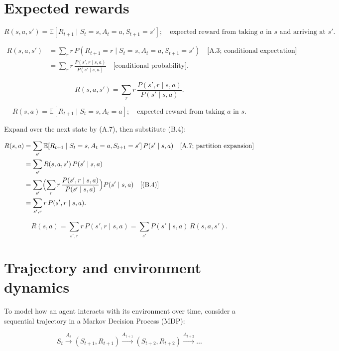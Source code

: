 \section{Expected rewards}

\[
R(s,a,s')=\mathbb{E}[R_{t+1}\mid S_t=s,A_t=a,S_{t+1}=s'];
\quad\text{expected reward from taking $a$ in $s$ and arriving at $s'$}.
\]

\[
\begin{aligned}
R(s,a,s')
&=
\sum_r r\, P(R_{t+1}=r\mid S_t=s,A_t=a,S_{t+1}=s')
\quad\text{[A.3; conditional expectation]}
\\
&=
\sum_r r\, \frac{P(s',r\mid s,a)}{P(s'\mid s,a)}
\quad\text{[conditional probability]}.
\end{aligned}
\]

\begin{equation}
R(s,a,s')
=
\sum_r r\, \frac{P(s',r\mid s,a)}{P(s'\mid s,a)}.
\tag{B.4}\label{eq:B.4}
\end{equation}

\[
R(s,a)=\mathbb{E}[R_{t+1}\mid S_t=s,A_t=a];
\quad\text{expected reward from taking $a$ in $s$}.
\]

Expand over the next state by (A.7), then substitute (B.4):

\[
\begin{aligned}
R(s,a)
&=
\sum_{s'}
\mathbb{E}[R_{t+1}\mid S_t=s,A_t=a,S_{t+1}=s']
\,
P(s'\mid s,a)
\quad\text{[A.7; partition expansion]}
\\
&=
\sum_{s'}
R(s,a,s')\, P(s'\mid s,a)
\\
&=
\sum_{s'}
\Bigl(
\sum_r r\, \frac{P(s',r\mid s,a)}{P(s'\mid s,a)}
\Bigr)
P(s'\mid s,a)
\quad\text{[(B.4)]}
\\
&=
\sum_{s',r} r\, P(s',r\mid s,a).
\end{aligned}
\]

\begin{equation}
R(s,a)
=
\sum_{s',r} r\, P(s',r\mid s,a)
=
\sum_{s'} P(s'\mid s,a)\, R(s,a,s').
\tag{B.5}\label{eq:B.5}
\end{equation}

\section{Trajectory and environment dynamics}

To model how an agent interacts with its environment over time, consider a sequential trajectory in a Markov Decision Process (MDP):

\[
S_t \xrightarrow{A_t} (S_{t+1}, R_{t+1}) \xrightarrow{A_{t+1}} (S_{t+2}, R_{t+2}) \xrightarrow{A_{t+2}} \dots
\]

